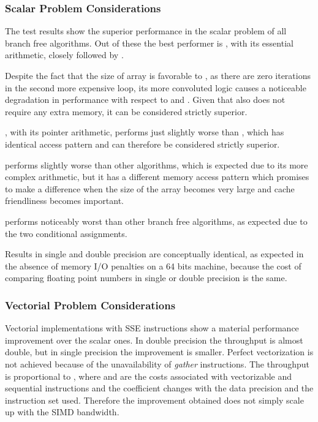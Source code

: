 \documentclass[preprint,1p,times]{elsarticle}
\begin{document}
\subsubsection{Scalar Problem Considerations}

The test results show the superior performance in the scalar problem of all branch free algorithms. Out of these the best performer is \textit{\BitSetName}, with its essential arithmetic, closely followed by \textit{\ClassicOffsetName}.

Despite the fact that the size of array  is favorable to \textit{\BitSetNoPadName}, as there are zero iterations in the second more expensive loop, its more convoluted logic causes a noticeable degradation in performance with respect to \textit{\BitSetName} and \textit{\ClassicOffsetName}. Given that \textit{\ClassicOffsetName} also does not require any extra memory, it can be considered strictly superior.

\textit{\MorinOffsetName}, with its pointer arithmetic, performs just slightly worse than \textit{\ClassicOffsetName}, which has identical access pattern and can therefore be considered strictly superior.

\textit{\EytzingerName} performs slightly worse than other algorithms, which is expected due to its more complex arithmetic, but it has a different memory access pattern which promises to make a difference when the size of the array  becomes very large and cache friendliness becomes important.

\textit{\ClassicModName} performs noticeably worst than other branch free algorithms, as expected due to the two conditional assignments.

Results in single and double precision are conceptually identical, as expected in the absence of memory I/O penalties on a 64 bits machine, because the cost of comparing floating point numbers in single or double precision is the same.

\subsubsection{Vectorial Problem Considerations}
\label{sec:testbinvec}
Vectorial implementations with SSE instructions show a material performance improvement over the scalar ones. In double precision the throughput is almost double, but in single precision the improvement is smaller. Perfect vectorization is not achieved because of the unavailability of \textit{gather} instructions. The throughput is proportional to , where  and  are the costs associated with vectorizable and sequential instructions and the coefficient  changes with the data precision and the instruction set used. Therefore the improvement obtained does not simply scale up with the SIMD bandwidth. 
\end{document}
